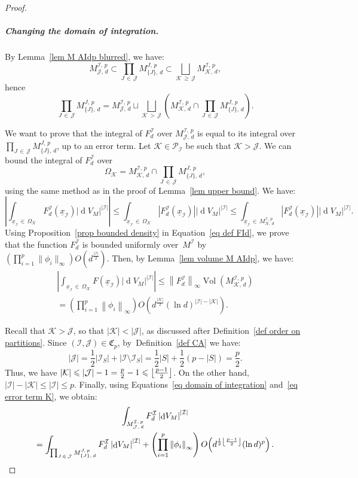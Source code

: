 \documentclass[AHL,Unicode,longabstracts,published]{cedram}
\DeclareMathOperator{\dmesure}{d}
\DeclareMathOperator{\Vol}{Vol}
\DeclarePairedDelimiter{\floor}{\lfloor}{\rfloor}
\newcommand{\I}{\mathcal{I}}
\newcommand{\J}{\mathcal{J}}
\newcommand{\K}{\mathcal{K}}
\newcommand{\frkC}{\mathfrak{C}}
\newcommand{\pa}{\mathcal{P}\!}
\newcommand{\norm}[1]{\left\lvert #1 \right\rvert}
\newcommand{\Norm}[1]{\left\lVert #1 \right\rVert}
\newcommand{\rmes}[1]{\norm{\dmesure\! V_{#1}}}
\newcommand{\vol}[1]{\Vol\!\left(#1\right)}
\renewcommand{\geq}{\geqslant}
\renewcommand{\leq}{\leqslant}
\begin{document}
\begin{proof}
\subparagraph*{Changing the domain of integration.}
By Lemma~\ref{lem M AIdp blurred}, we have:
\[
M^{\I,\,p}_{\J,\,d} \subset \prod_{J\,\in\,\J} M^{J,\,p}_{\{J\},\,d} \subset \bigsqcup_{\K\,\geq\,\J} M^{\I,\,p}_{\K,\,d},
\]
hence
\begin{equation}\label{eq domain of integration}
\prod_{J\,\in\,\J} M^{J,\,p}_{\{J\},\,d} = M^{\I,\,p}_{\J,\,d} \sqcup \bigsqcup_{\K\,>\,\J} \left(M^{\I,\,p}_{\K,\,d} \cap \prod_{J\,\in\,\J} M^{J,\,p}_{\{J\},\,d}\right).
\end{equation}

We want to prove that the integral of $F_d^\I$ over $M^{\I,\,p}_{\J,\,d}$ is equal to its integral over $\prod_{J\,\in\,\J} M^{J,\,p}_{\{J\},\,d}$, up to an error term. Let $\K \in \pa_\I$ be such that $\K > \J$. We can bound the integral of $F_d^\I$ over
\[
\Omega_\K = M^{\I,\,p}_{\K,\,d} \cap \prod_{J\,\in\,\J} M^{J,\,p}_{\{J\},\,d},
\]
using the same method as in the proof of Lemma~\ref{lem upper bound}. We have:
\[
\norm{\int_{\underline{x}_\I\,\in\,\Omega_\K} F_d^\I\left(\underline{x}_\I\right) \rmes{M}^{\norm{\I}}} \leq \int_{\underline{x}_\I\,\in\,\Omega_\K} \norm{F_d^\I\left(\underline{x}_\I\right)} \rmes{M}^{\norm{\I}} \leq \int_{\underline{x}_\I\,\in\,M^{\I,\,p}_{\K,\,d}} \norm{F_d^\I\left(\underline{x}_\I\right)} \rmes{M}^{\norm{\I}}.
\]
Using Proposition~\ref{prop bounded density} in Equation~\eqref{eq def FId}, we prove that the function $F_d^\I$ is bounded uniformly over~$M^\I$ by $(\prod_{i=1}^p \|\phi_i\|_\infty) O(d^\frac{|\I|}{2})$. Then, by Lemma~\ref{lem volume M AIdp}, we have:
\begin{multline}\label{eq error term K}
\norm{\int_{\underline{x}_\I\,\in\,\Omega_\K} F(\underline{x}_\I) \rmes{M}^{\norm{\I}}} \leq \Norm{F^\I_d}_\infty \vol{M^{\I,\,p}_{\K,\,d}}\\
= \left(\prod_{i=1}^p \Norm{\phi_i}_\infty\right) O\!\left(d^{\frac{\norm{\K}}{2}}(\ln d)^{\norm{\I}-\norm{\K}}\right).
\end{multline}

Recall that $\K > \J$, so that $|\K| < |\J|$, as discussed after Definition~\ref{def order on partitions}. Since $(\I,\J) \in \frkC_p$, by~Definition~\ref{def CA} we have:
\[
\norm{\J} = \frac{1}{2}\norm{\I_S} + \norm{\I \setminus \I_S} = \frac{1}{2}\norm{S} + \frac{1}{2}\left(p - \norm{S}\right) = \frac{p}{2}.
\]
Thus, we have $|\K| \leq |\J|-1 = \frac{p}{2}-1 \leq \floor*{\frac{p-1}{2}}$. On the other hand, $|\I| - |\K| \leq |\I| \leq p$. Finally, using Equations~\eqref{eq domain of integration} and~\eqref{eq error term K}, we obtain:
\begin{multline}\label{eq integral FId}
\int_{M^{\I,\,p}_{\J,\,d}} F_d^\I \rmes{M}^{\norm{\I}}\\
= \int_{\prod_{J\,\in\,\J} M^{J,\,p}_{\{J\},\,d}} F_d^\I \rmes{M}^{\norm{\I}} +\left(\prod_{i=1}^p \Norm{\phi_i}_\infty\right)O\!\left(d^{\frac{1}{2}\floor*{\frac{p-1}{2}}}(\ln d)^p\right).
\end{multline}


\end{proof}
\end{document}
